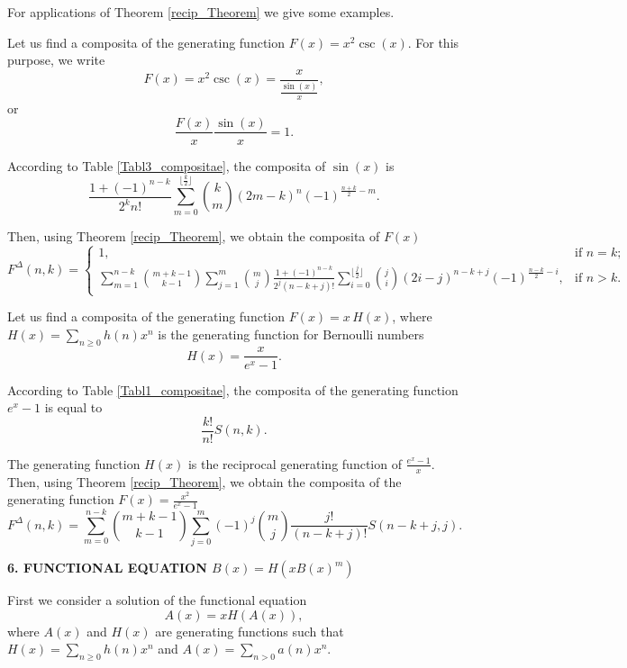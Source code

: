 \documentclass[12pt]{article}
\begin{document}
For applications of Theorem \ref{recip_Theorem} we give some examples.
\begin{example} Let us find a composita of the generating function $F(x)=x^2\csc(x)$. For this purpose, we write
$$
F(x)=x^2\csc(x)=\frac{x}{\frac{\sin(x)}{x}},
$$
or
$$
\frac{F(x)}{x}\frac{\sin(x)}{x}=1.
$$

According to Table \ref{Tabl3_compositae}, the composita of $\sin(x)$ is
$$
\frac{1+(-1)^{n-k}}{2^{k}n!}\sum_{m=0}^{\lfloor \frac{k}{2} \rfloor} {k \choose m} (2m-k)^n(-1)^{\frac{n+k}{2}-m}.
$$

Then, using Theorem \ref{recip_Theorem}, we obtain the composita of $F(x)$
$$
F^{\Delta}(n,k)=\begin{cases}
1, & \text{if $n=k$};\\
\sum\limits_{m=1}^{n-k}\binom{m+k-1}{k-1}
 \sum\limits_{j=1}^{m}\binom{m}{j}
 \frac{1+(-1)^{n-k}}{2^{j}(n-k+j)!}\sum\limits_{i=0}^{\lfloor \frac{j}{2} \rfloor} {j \choose i} (2i-j)^{n-k+j}(-1)^{\frac{n-k}{2}-i}, & \text{if $n>k$}.
\end{cases}
$$
\end{example}

\begin{example}
Let us find a composita of the generating function $F(x)=x\,H(x)$, where $H(x)=\sum_{n\geq 0}h(n)x^n$ is the generating function for Bernoulli numbers
$$
H(x)=\frac{x}{e^x-1}.
$$

According to Table \ref{Tabl1_compositae}, the composita of the generating function $e^x-1$ is equal to
$$
\frac{k!}{n!}S(n,k).
$$

The generating function $H(x)$ is the reciprocal generating function of $\frac{e^x-1}{x}$.
Then, using Theorem \ref{recip_Theorem}, we obtain the composita of the generating function $F(x)=\frac{x^2}{e^x-1}$
$$
F^{\Delta}(n,k)=\sum\limits_{m=0}^{n-k}\binom{m+k-1}{k-1}
 \sum\limits_{j=0}^{m}(-1)^{j}\binom{m}{j}\frac{j!}{(n-k+j)!}S(n-k+j,j).
$$
\end{example}

\vspace{1.5cc}
\begin{center}
{\bf 6. FUNCTIONAL EQUATION $B(x)=H(xB(x)^m)$}
\end{center}

First we consider a solution of the functional equation
\begin{equation}\label{Lagrange}
A(x)=xH(A(x)),
\end{equation}
where $A(x)$ and $H(x)$ are generating functions such that $H(x)=\sum_{n\geq 0}h(n)x^n$ and $A(x)=\sum_{n> 0}a(n)x^n$.
\end{document}
